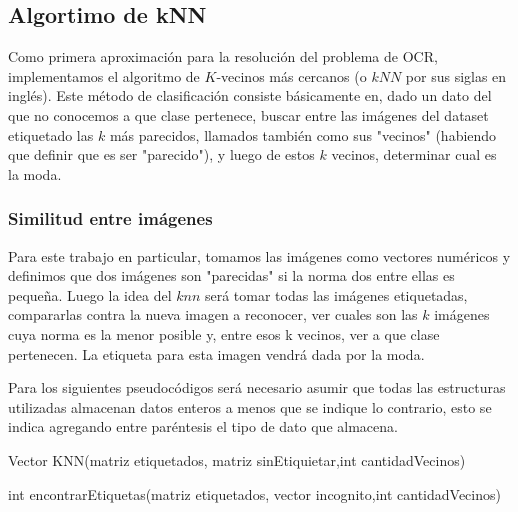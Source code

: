 \subsection{Algortimo de kNN}
Como primera aproximación para la resolución del problema de OCR, implementamos el algoritmo de $K$-vecinos más cercanos (o $kNN$ por sus siglas en inglés). Este método de clasificación consiste básicamente en, dado un dato del que no conocemos a que clase pertenece, buscar entre las imágenes del dataset etiquetado las $k$ más parecidos, llamados también como sus "vecinos" (habiendo que definir que es ser "parecido"), y luego de estos $k$ vecinos, determinar cual es la moda. 
\\
\subsubsection{Similitud entre imágenes}
Para este trabajo en particular, tomamos las imágenes como vectores numéricos y definimos que dos imágenes son "parecidas" si la norma dos entre ellas es pequeña. Luego la idea del $knn$ será tomar todas las imágenes etiquetadas, compararlas contra la nueva imagen a reconocer, ver cuales son las $k$ imágenes cuya norma es la menor posible y, entre esos k vecinos, ver a que clase pertenecen. La etiqueta para esta imagen vendrá dada por la moda. 

Para los siguientes pseudocódigos será necesario asumir que todas las estructuras utilizadas almacenan datos enteros a menos que se indique lo contrario, esto se indica agregando entre paréntesis el tipo de dato que almacena.
\\
\begin{algorithm}
\begin{algorithmic}[1]\parskip=1mm
\caption{Vector KNN(matriz etiquetados, matriz sinEtiquietar,int cantidadVecinos)}
\ENDFOR
{}
\end{algorithmic}
\end{algorithm}

\begin{algorithm}
\begin{algorithmic}[1]\parskip=1mm
\caption{int encontrarEtiquetas(matriz etiquetados, vector incognito,int cantidadVecinos)}
\ENDFOR
{}
\ENDWHILE\\
\end{algorithmic}
\end{algorithm}

